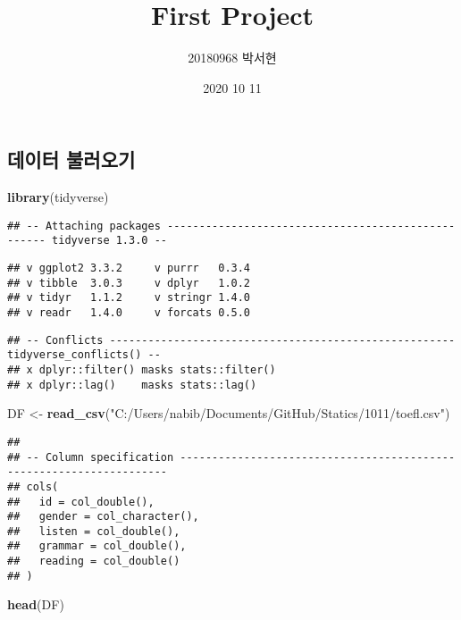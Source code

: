 \documentclass[
]{article}
\title{First Project}
\author{20180968 박서현}
\date{2020 10 11}
\newenvironment{Shaded}{\begin{snugshade}}{\end{snugshade}}
\newcommand{\KeywordTok}[1]{\textcolor[rgb]{0.13,0.29,0.53}{\textbf{#1}}}
\newcommand{\NormalTok}[1]{#1}
\newcommand{\StringTok}[1]{\textcolor[rgb]{0.31,0.60,0.02}{#1}}
\begin{document}
\maketitle

\hypertarget{uxb370uxc774uxd130-uxbd88uxb7ecuxc624uxae30}{%
\subsection{데이터
불러오기}\label{uxb370uxc774uxd130-uxbd88uxb7ecuxc624uxae30}}

\begin{Shaded}
\begin{Highlighting}[]
\KeywordTok{library}\NormalTok{(tidyverse)}
\end{Highlighting}
\end{Shaded}

\begin{verbatim}
## -- Attaching packages --------------------------------------------------- tidyverse 1.3.0 --
\end{verbatim}

\begin{verbatim}
## v ggplot2 3.3.2     v purrr   0.3.4
## v tibble  3.0.3     v dplyr   1.0.2
## v tidyr   1.1.2     v stringr 1.4.0
## v readr   1.4.0     v forcats 0.5.0
\end{verbatim}

\begin{verbatim}
## -- Conflicts ------------------------------------------------------ tidyverse_conflicts() --
## x dplyr::filter() masks stats::filter()
## x dplyr::lag()    masks stats::lag()
\end{verbatim}

\begin{Shaded}
\begin{Highlighting}[]
\NormalTok{DF <-}\StringTok{ }\KeywordTok{read_csv}\NormalTok{(}\StringTok{"C:/Users/nabib/Documents/GitHub/Statics/1011/toefl.csv"}\NormalTok{)}
\end{Highlighting}
\end{Shaded}

\begin{verbatim}
## 
## -- Column specification --------------------------------------------------------------------
## cols(
##   id = col_double(),
##   gender = col_character(),
##   listen = col_double(),
##   grammar = col_double(),
##   reading = col_double()
## )
\end{verbatim}

\begin{Shaded}
\begin{Highlighting}[]
\KeywordTok{head}\NormalTok{(DF)}
\end{Highlighting}
\end{Shaded}
\end{document}
